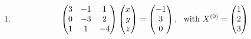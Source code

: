 {\begin{enumerate}[label=\alph*)]
	
	\item \begin{align*}
	\begin{pmatrix}
	3 & -1 &  1 \\
	0 & -3 &  2 \\
	1 &  1 & -4
	\end{pmatrix}
	\begin{pmatrix}
	x \\
	y \\
	z
	\end{pmatrix}
	=
	\begin{pmatrix}
	-1 \\
	3 \\
	0
	\end{pmatrix}, \,\,\,\,
	{\rm with} \,\,
	X^{(0)}=
	\begin{pmatrix}
	1 \\
	2 \\
	3
	\end{pmatrix}
	\end{align*}
\end{enumerate}
}